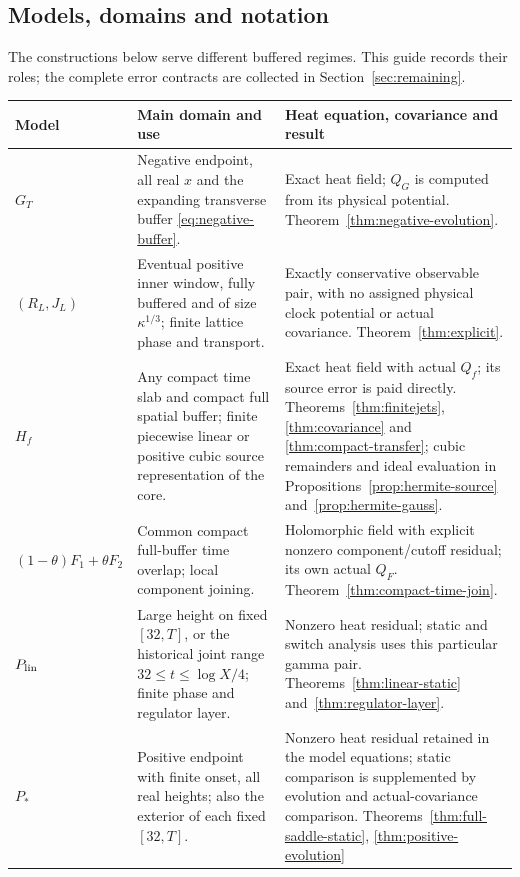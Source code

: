 \subsection{Models, domains and notation}
The constructions below serve different buffered regimes. This guide
records their roles; the complete error contracts are collected in
Section~\ref{sec:remaining}.
\begingroup\small
\begin{longtable}{@{}>{\raggedright\arraybackslash}p{}>{\raggedright\arraybackslash}p{}>{\raggedright\arraybackslash}p{}@{}}
\toprule
Model & Main domain and use & Heat equation, covariance and result\\
\midrule\endhead
$G_T$ & Negative endpoint, all real $x$ and the expanding transverse
buffer \eqref{eq:negative-buffer}. &
Exact heat field; $Q_G$ is computed from its physical potential.
Theorem~\ref{thm:negative-evolution}.\\
$(R_L,J_L)$ & Eventual positive inner window, fully buffered and of
size $\kappa^{1/3}$; finite lattice phase and transport. &
Exactly conservative observable pair, with no assigned physical clock
potential or actual covariance. Theorem~\ref{thm:explicit}.\\
$H_f$ & Any compact time slab and compact full spatial buffer;
finite piecewise linear or positive cubic source representation of the core. &
Exact heat field with actual $Q_f$; its source error is paid directly.
Theorems~\ref{thm:finitejets}, \ref{thm:covariance} and
\ref{thm:compact-transfer}; cubic remainders and ideal evaluation in
Propositions~\ref{prop:hermite-source} and~\ref{prop:hermite-gauss}.\\
$(1-\theta)F_1+\theta F_2$ & Common compact full-buffer time overlap;
local component joining. & Holomorphic field with explicit nonzero
component/cutoff residual; its own actual $Q_F$.
Theorem~\ref{thm:compact-time-join}.\\
$P_{\rm lin}$ & Large height on fixed $[32,T]$, or the historical
joint range $32\le t\le\log X/4$; finite phase and regulator layer. &
Nonzero heat residual; static and switch analysis uses this particular
gamma pair. Theorems~\ref{thm:linear-static} and~\ref{thm:regulator-layer}.\\
$P_*$ & Positive endpoint with finite onset, all real heights;
also the exterior of each fixed $[32,T]$. &
Nonzero heat residual retained in the model equations; static
comparison is supplemented by evolution and actual-covariance comparison.
Theorems~\ref{thm:full-saddle-static}, \ref{thm:positive-evolution}

\end{longtable}

